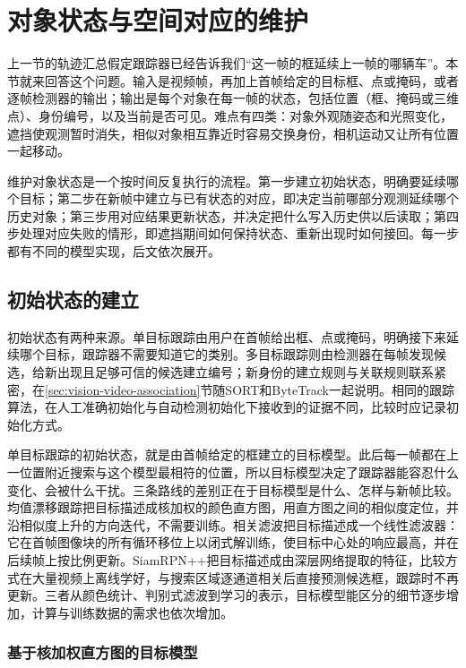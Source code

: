 \section{对象状态与空间对应的维护}
\label{sec:vision-video-tracking}

上一节的轨迹汇总假定跟踪器已经告诉我们“这一帧的框延续上一帧的哪辆车”。本节就来回答这个问题。输入是视频帧，再加上首帧给定的目标框、点或掩码，或者逐帧检测器的输出；输出是每个对象在每一帧的状态，包括位置（框、掩码或三维点）、身份编号，以及当前是否可见。难点有四类：对象外观随姿态和光照变化，遮挡使观测暂时消失，相似对象相互靠近时容易交换身份，相机运动又让所有位置一起移动。

维护对象状态是一个按时间反复执行的流程。第一步建立初始状态，明确要延续哪个目标；第二步在新帧中建立与已有状态的对应，即决定当前哪部分观测延续哪个历史对象；第三步用对应结果更新状态，并决定把什么写入历史供以后读取；第四步处理对应失败的情形，即遮挡期间如何保持状态、重新出现时如何接回。每一步都有不同的模型实现，后文依次展开。

\subsection{初始状态的建立}
\label{sec:vision-video-initialization}

初始状态有两种来源。单目标跟踪由用户在首帧给出框、点或掩码，明确接下来延续哪个目标，跟踪器不需要知道它的类别。多目标跟踪则由检测器在每帧发现候选，给新出现且足够可信的候选建立编号；新身份的建立规则与关联规则联系紧密，在\ref{sec:vision-video-association}节随SORT和ByteTrack一起说明。相同的跟踪算法，在人工准确初始化与自动检测初始化下接收到的证据不同，比较时应记录初始化方式。

单目标跟踪的初始状态，就是由首帧给定的框建立的目标模型。此后每一帧都在上一位置附近搜索与这个模型最相符的位置，所以目标模型决定了跟踪器能容忍什么变化、会被什么干扰。三条路线的差别正在于目标模型是什么、怎样与新帧比较。均值漂移跟踪把目标描述成核加权的颜色直方图，用直方图之间的相似度定位，并沿相似度上升的方向迭代，不需要训练。相关滤波把目标描述成一个线性滤波器：它在首帧图像块的所有循环移位上以闭式解训练，使目标中心处的响应最高，并在后续帧上按比例更新。SiamRPN++把目标描述成由深层网络提取的特征，比较方式在大量视频上离线学好，与搜索区域逐通道相关后直接预测候选框，跟踪时不再更新。三者从颜色统计、判别式滤波到学习的表示，目标模型能区分的细节逐步增加，计算与训练数据的需求也依次增加。

\subsubsection{基于核加权直方图的目标模型}
\label{sec:vision-video-meanshift}

